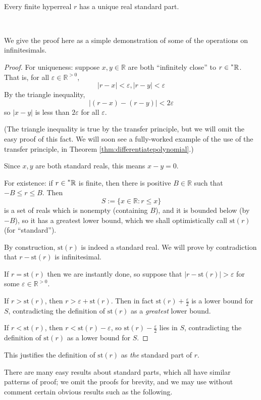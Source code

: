 \documentclass[11pt]{amsart}
\theoremstyle{remark}
\newcommand{\st}{\mathrm{st}}
\newcommand{\hyp}[1][\mathbb{R}]{\prescript{*}{}{#1}}
\begin{document}
\

\begin{thm}
Every finite hyperreal $r$ has a unique real standard part.
\end{thm}

\

We give the proof here as a simple demonstration of some of the operations on infinitesimals.

\begin{proof}
For uniqueness: suppose $x, y \in \mathbb{R}$ are both ``infinitely close'' to $r \in \hyp$.
That is, for all $\varepsilon \in \mathbb{R}^{>0}$, $$|r-x| < \varepsilon, |r-y| < \varepsilon$$
By the triangle inequality, $$|(r-x) - (r-y)| < 2 \varepsilon$$
so $|x-y|$ is less than $2 \varepsilon$ for all $\varepsilon$.

(The triangle inequality is true by the transfer principle, but we will omit the easy proof of this fact.
We will soon see a fully-worked example of the use of the transfer principle, in Theorem \ref{thm:differentiatepolynomial}.)

Since $x, y$ are both standard reals, this means $x-y = 0$.

For existence: if $r \in \hyp$ is finite, then there is positive $B \in \mathbb{R}$ such that $-B \leq r \leq B$.
Then $$S := \{ x \in \mathbb{R}: r \leq x \}$$ is a set of reals which is nonempty (containing $B$), and it is bounded below (by $-B$), so it has a greatest lower bound, which we shall optimistically call $\st(r)$ (for ``standard'').

By construction, $\st(r)$ is indeed a standard real.
We will prove by contradiction that $r-\st(r)$ is infinitesimal.

If $r = \st(r)$ then we are instantly done, so suppose that $|r - \st(r)| > \varepsilon$ for some $\varepsilon \in \mathbb{R}^{>0}$.

If $r > \st(r)$, then $r > \varepsilon + \st(r)$.
Then in fact $\st(r) + \frac{\varepsilon}{2}$ is a lower bound for $S$, contradicting the definition of $\st(r)$ as a \emph{greatest} lower bound.

If $r < \st(r)$, then $r < \st(r) - \varepsilon$, so $\st(r) - \frac{\varepsilon}{2}$ lies in $S$, contradicting the definition of $\st(r)$ as a lower bound for $S$.
\end{proof}

This justifies the definition of $\st(r)$ as \emph{the} standard part of $r$.

There are many easy results about standard parts, which all have similar patterns of proof; we omit the proofs for brevity, and we may use without comment certain obvious results such as the following.
\end{document}
